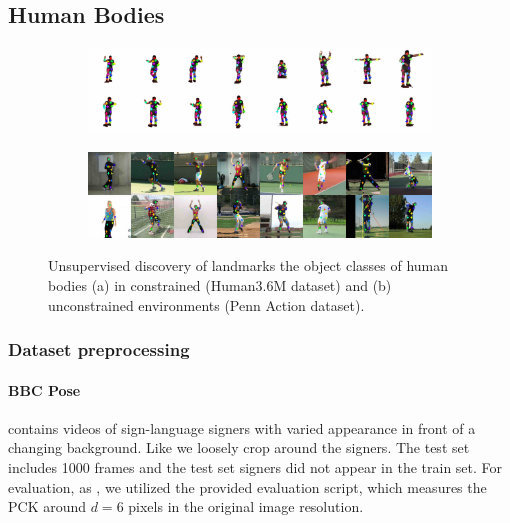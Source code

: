 	\subsection{Human Bodies}
		\begin{figure}[htp]
			\centering
			\begin{subfigure}{1.\textwidth}
			\includegraphics[trim={0cm 0cm 0cm 0cm},clip, width=1.\linewidth]{fig/shape/0human}\caption{}
			\end{subfigure}
			\begin{subfigure}{1.\textwidth}
			\includegraphics[trim={0cm 0cm 0cm 0cm},clip, width=1.\linewidth]{fig/shape/0penn}\caption{}
			\end{subfigure}
			\caption{{Unsupervised discovery of landmarks the object classes of human bodies (a) in constrained (Human3.6M dataset) and (b) unconstrained environments (Penn Action dataset).}}
			\label{fig:kp_bodies}
		\end{figure}

		\subsubsection{Dataset preprocessing}
			\paragraph{BBC Pose} \cite{charles13bbcpose} contains videos of sign-language signers with varied appearance in front of a changing background. Like \cite{jakab18} we loosely crop around the signers.
			The test set includes 1000 frames and the test set signers did not appear in the train set.
			For evaluation, as \cite{jakab18}, we utilized the provided evaluation script, which measures the PCK around $d=6$ pixels in the original image resolution.



